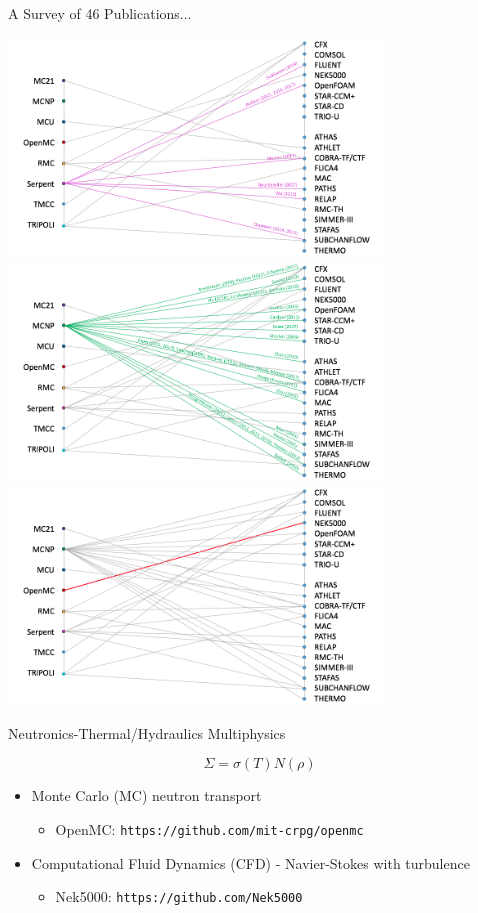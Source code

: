 \documentclass[10pt]{beamer}
\begin{document}
\begin{frame}{A Survey of 46 Publications... }
\begin{overprint}
\centering\includegraphics[width=10cm]{../Figures/history5.png}
\centering\includegraphics[width=10cm]{../Figures/history8.png}
\centering\includegraphics[width=10cm]{../Figures/history7.png}
\end{overprint}
\end{frame}

\begin{frame}{Neutronics-Thermal/Hydraulics Multiphysics}

\begin{equation}
\Sigma=\sigma(T) N(\rho)
\end{equation}
\vspace{0.5cm}
\begin{itemize}
\item Monte Carlo (MC) neutron transport
	\begin{itemize}
	\item OpenMC: {\tt https://github.com/mit-crpg/openmc}\newline
	\end{itemize}
\item Computational Fluid Dynamics (CFD) - Navier-Stokes with turbulence
	\begin{itemize}
	\item Nek5000: {\tt https://github.com/Nek5000}
	\end{itemize}
\end{itemize}
\end{frame}
\end{document}

